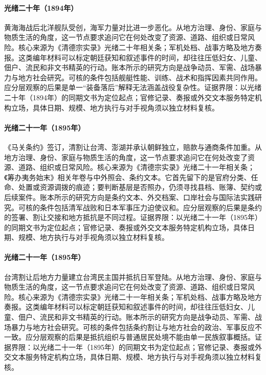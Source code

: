 \hypertarget{social:EQ-1894-YALU-NAVAL-BATTLE}{}\paragraph{光绪二十年（1894年）}黄海海战后北洋舰队受创，海军力量对比进一步恶化。从地方治理、身份、家庭与物质生活的角度，这一节点要求追问它在何处改变了资源、道路、组织或日常风险。核心来源为《清德宗实录》光绪二十年相关条；军机处档、战事方略及地方奏报。这类编年材料可以标定朝廷获知和叙述事件的时间，却往往压低妇女、儿童、佃户、流民和非文书精英的行动。账本所示的研究方向是战争动员、军需、战场暴力与地方社会研究。可核的条件包括舰艇性能、训练、战术和指挥因素共同作用。应分层观察的后果是单一“装备落后”解释无法涵盖战役复杂性。证据界限：以光绪二十年（1894年）的同期文书为定位起点；官修记录、奏报或外交文本服务特定机构立场，具体日期、规模、地方执行与对手视角须以独立材料复核。
\hypertarget{social:EQ-1895-SHIMONOSEKI-TREATY}{}\paragraph{光绪二十一年（1895年）}《马关条约》签订，清割让台湾、澎湖并承认朝鲜独立，赔款与通商条件加重。从地方治理、身份、家庭与物质生活的角度，这一节点要求追问它在何处改变了资源、道路、组织或日常风险。核心来源为《清德宗实录》光绪二十一年相关条；《筹办夷务始末》相关年卷与中外照会、条约文本。它首先留下的是官府分类、任命、处置或资源调拨的痕迹；要判断基层是否照办，仍须寻找县档、账簿、契约或后续案件。账本所示的研究方向是条约文本、外交档案、口岸社会与国际法实践研究。可核的条件包括清军战败和日本军事压力迫使议和。应分层观察的后果是条约的签署、割让交接和地方抵抗是不同过程。证据界限：以光绪二十一年（1895年）的同期文书为定位起点；官修记录、奏报或外交文本服务特定机构立场，具体日期、规模、地方执行与对手视角须以独立材料复核。
\hypertarget{social:EQ-1895-TAIWAN-REPUBLIC-RESISTANCE}{}\paragraph{光绪二十一年（1895年）}台湾割让后地方力量建立台湾民主国并抵抗日军登陆。从地方治理、身份、家庭与物质生活的角度，这一节点要求追问它在何处改变了资源、道路、组织或日常风险。核心来源为《清德宗实录》光绪二十一年相关条；军机处档、战事方略及地方奏报。这类编年材料可以标定朝廷获知和叙述事件的时间，却往往压低妇女、儿童、佃户、流民和非文书精英的行动。账本所示的研究方向是战争动员、军需、战场暴力与地方社会研究。可核的条件包括条约割让与地方社会的政治、军事反应不一致。应分层观察的后果是抵抗组织与普通居民处境不能由单一民族叙事概括。证据界限：以光绪二十一年（1895年）的同期文书为定位起点；官修记录、奏报或外交文本服务特定机构立场，具体日期、规模、地方执行与对手视角须以独立材料复核。
